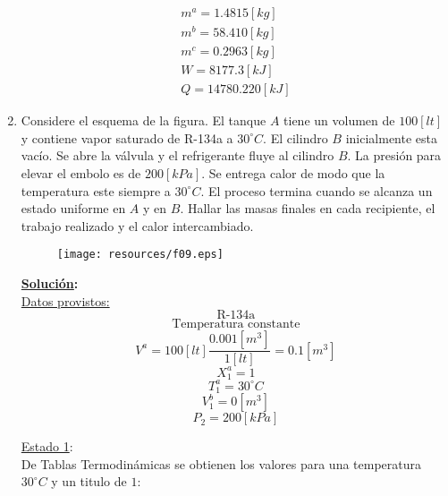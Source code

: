 \documentclass[letter,11pt]{article}
\begin{document}
\begin{enumerate}
\begin{equation*}
\boxed{
    \begin{array}{l}
        m^a = 1.4815[kg] \\
        m^b = 58.410[kg] \\
        m^c = 0.2963[kg] \\
        W = 8177.3[kJ] \\
        Q = 14780.220[kJ]
    \end{array}
}
\end{equation*}
\newpage

\item Considere el esquema de la figura. El tanque $A$ tiene un volumen de
$100[lt]$ y contiene vapor saturado de R-134a a $30^\circ C$. El cilindro $B$
inicialmente esta vacío. Se abre la válvula y el refrigerante fluye al cilindro
$B$. La presión para elevar el embolo es de $200[kPa]$. Se entrega calor de modo
que la temperatura este siempre a $30^\circ C$. El proceso termina cuando se
alcanza un estado uniforme en $A$ y en $B$. Hallar las masas finales en cada
recipiente, el trabajo realizado y el calor intercambiado.

\begin{figure}[H]
\centering
\texttt{[image: resources/f09.eps]}
\end{figure}

\textbf{\underline{Solución}:} \\

\underline{Datos provistos:}
\begin{equation*}
    \text{R-134a}
\end{equation*}
\begin{equation*}
    \text{Temperatura constante}
\end{equation*}
\begin{equation*}
    V^a = 100[lt]\frac{0.001[m^3]}{1[lt]} = 0.1[m^3]
\end{equation*}
\begin{equation*}
    X_1^a = 1
\end{equation*}
\begin{equation*}
    T_1^a = 30^\circ C
\end{equation*}
\begin{equation*}
    V_1^b = 0[m^3]
\end{equation*}
\begin{equation*}
    P_2 = 200[kPa]
\end{equation*}

\underline{Estado 1}: \\
De Tablas Termodinámicas se obtienen los valores para una temperatura
$30^\circ C$ y un titulo de $1$:


\end{enumerate}
\end{document}
